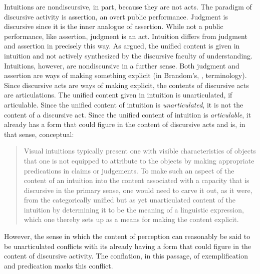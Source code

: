 \documentclass[12pt]{article}
\begin{document}
Intuitions are nondiscursive, in part, because they are not acts. The paradigm of discursive activity is assertion, an overt public performance. Judgment is discursive since it is the inner analogue of assertion. While not a public performance, like assertion, judgment is an act. Intuition differs from judgment and assertion in precisely this way. As \citet[chapter 9]{Prichard:1909yg} argued, the unified content is given in intuition and not actively synthesized by the discursive faculty of understanding. Intuitions, however, are nondiscursive in a further sense. Both judgment and assertion are ways of making something explicit (in Brandom's, \citeyear{Brandom:1994fk}, terminology). Since discursive acts are ways of making explicit, the contents of discursive acts are articulations. The unified content given in intuition is unarticulated, if articulable. Since the unified content of intuition is \emph{unarticulated}, it is not the content of a discursive act. Since the unified content of intuition is \emph{articulable}, it already has a form that could figure in the content of discursive acts and is, in that sense, conceptual:
\begin{quote}
	Visual intuitions typically present one with visible characteristics of objects that one is not equipped to attribute to the objects by making appropriate predications in claims or judgements. To make such an aspect of the content of an intuition into the content associated with a capacity that is discursive in the primary sense, one would need to carve it out, as it were, from the categorically unified but as yet unarticulated content of the intuition by determining it to be the meaning of a linguistic expression, which one thereby sets up as a means for making the content explicit.
\end{quote}
However, the sense in which the content of perception can reasonably be said to be unarticulated conflicts with its already having a form that could figure in the content of discursive activity. The conflation, in this passage, of exemplification and predication masks this conflict.
\end{document}

